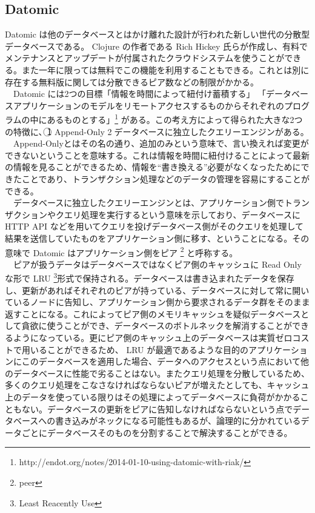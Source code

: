 \documentclass{scrartcl}
\begin{document}
\subsection{Datomic}
\label{sec:org3495517}
 Datomic は他のデータベースとはかけ離れた設計が行われた新しい世代の分散型データベースである。 Clojure の作者である Rich Hickey 氏らが作成し、有料でメンテナンスとアップデートが付属されたクラウドシステムを使うことができる。また一年に限っては無料でこの機能を利用することもできる。これとは別に存在する無料版に関しては分散できるピア数などの制限がかかる。\\
 　Datomic には2つの目標「情報を時間によって紐付け蓄積する」 「データベースアプリケーションのモデルをリモートアクセスするものからそれぞれのプログラムの中にあるものとする」\footnote{http://endot.org/notes/2014-01-10-using-datomic-with-riak/} がある。この考え方によって得られた大きな2つの特徴に、\textcircled{\scriptsize 1} Append-Only \textcircled{\scriptsize 2}データベースに独立したクエリーエンジンがある。\\
　Append-Onlyとはその名の通り、追加のみという意味で、言い換えれば変更ができないということを意味する。これは情報を時間に紐付けることによって最新の情報を見ることができるため、情報を``書き換える''必要がなくなったためにできたことであり、トランザクション処理などのデータの管理を容易にすることができる。\\
　データベースに独立したクエリーエンジンとは、アプリケーション側でトランザクションやクエリ処理を実行するという意味を示しており、データベースに HTTP API などを用いてクエリを投げデータベース側がそのクエリを処理して結果を送信していたものをアプリケーション側に移す、ということになる。その意味で Datomic はアプリケーション側をピア \footnote{peer} と呼称する。\\
　ピアが扱うデータはデータベースではなくピア側のキャッシュに Read Only な形で LRU \footnote{Least Reacently Use}形式で保持される。データベースは書き込まれたデータを保存し、更新があればそれぞれのピアが持っている、データベースに対して常に開いているノードに告知し、アプリケーション側から要求されるデータ群をそのまま返すことになる。これによってピア側のメモリキャッシュを疑似データベースとして貪欲に使うことができ、データベースのボトルネックを解消することができるようになっている。更にピア側のキャッシュ上のデータベースは実質ゼロコストで用いることができるため、 LRU が最適であるような目的のアプリケーションにこのデータベースを適用した場合、データへのアクセスという点において他のデータベースに性能で劣ることはない。またクエリ処理を分散しているため、多くのクエリ処理をこなさなければならないピアが増えたとしても、キャッシュ上のデータを使っている限りはその処理によってデータベースに負荷がかかることもない。データベースの更新をピアに告知しなければならないという点でデータベースへの書き込みがネックになる可能性もあるが、論理的に分かれているデータごとにデータベースそのものを分割することで解決することができる。\\
\end{document}
